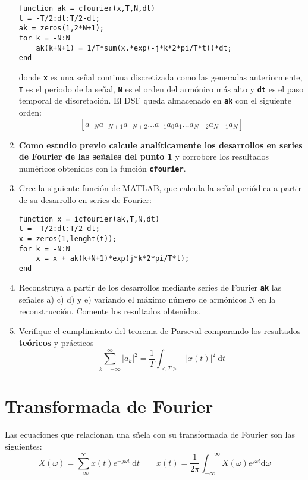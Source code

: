 \documentclass{article}
\newcommand{\code}[1]{\texttt{\textbf{#1}}}
\newcommand{\dt}{\:\mathrm{d}t}
\begin{document}
\begin{enumerate}[leftmargin=*]
	\begin{lstlisting}
function ak = cfourier(x,T,N,dt)
t = -T/2:dt:T/2-dt;
ak = zeros(1,2*N+1);
for k = -N:N
	ak(k+N+1) = 1/T*sum(x.*exp(-j*k*2*pi/T*t))*dt;
end
	\end{lstlisting}
	
donde \code{x} es una señal continua discretizada como las generadas anteriormente, \code{T} es el periodo de la señal, \code{N} es el orden del armónico más alto y \code{dt} es el paso temporal de discretación. El DSF queda almacenado en \code{ak} con el siguiente orden: \[ \left[a_{-N}a_{-N+1}a_{-N+2}\dots a_{-1}a_0a_1\dots a_{N-2}a_{N-1}a_{N}\right] \]
\item \textbf{Como estudio previo calcule analíticamente los desarrollos en series de Fourier de las señales del punto 1} y corrobore los resultados numéricos obtenidos con la función \code{cfourier}.
\item Cree la siguiente función de MATLAB, que calcula la señal periódica a partir de su desarrollo en series de Fourier:

\begin{lstlisting}
function x = icfourier(ak,T,N,dt)
t = -T/2:dt:T/2-dt;
x = zeros(1,lenght(t));
for k = -N:N
	x = x + ak(k+N+1)*exp(j*k*2*pi/T*t);
end
\end{lstlisting}
\item Reconstruya a partir de los desarrollos mediante series de Fourier \code{ak} las señales a) c) d) y e) variando el máximo número de armónicos N en la reconstrucción. Comente los resultados obtenidos.

\item Verifique el cumplimiento del teorema de Parseval comparando los resultados \textbf{teóricos} y prácticos \[ \sum_{k=-\infty}^{\infty}|a_k|^2=\dfrac{1}{T}\int_{<T>}|x(t)|^2\dt \]
\end{enumerate}
\section{Transformada de Fourier}
Las ecuaciones que relacionan una sñela con su transformada de Fourier son las siguientes: \[ X(\omega)=\sum_{-\infty}^{\infty}x(t)e^{-j\omega t}\dt\qquad x(t)=\dfrac{1}{2\pi}\int_{-\infty}^{+\infty}X(\omega)e^{j\omega t}\mathrm{d}\omega \]
\end{document}
